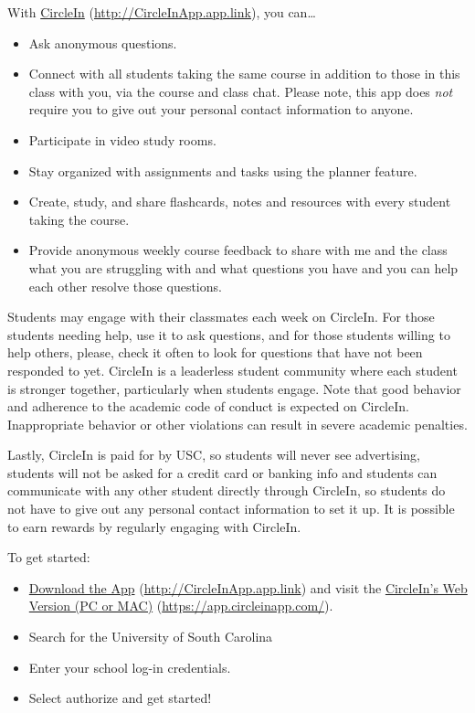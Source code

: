 \documentclass[11pt,letterpaper]{article}
\begin{document}
With \href{http://CircleInApp.app.link}{CircleIn} (\url{http://CircleInApp.app.link}), you can\dots
	\begin{itemize}
	\item Ask anonymous questions.
	\item Connect with all students taking the same course in addition to those in this class with you, via the course and class chat. Please note, this app does {\itshape not} require you to give out your personal contact information to anyone.
	\item Participate in video study rooms.
	\item Stay organized with assignments and tasks using the planner feature.
	\item Create, study, and share flashcards, notes and resources with every student taking the course.
	\item Provide anonymous weekly course feedback to share with me and the class what you are struggling with and what questions you have and you can help each other resolve those questions. 
	\end{itemize}

Students may engage with their classmates each week on CircleIn. For those students needing help, use it to ask questions, and for those students willing to help others, please, check it often to look for questions that have not been responded to yet. CircleIn is a leaderless student community where each student is stronger together, particularly when students engage. Note that good behavior and adherence to the academic code of conduct is expected on CircleIn. Inappropriate behavior or other violations can result in severe academic penalties. \par\vspace{0.3cm}

Lastly, CircleIn is paid for by USC, so students will never see advertising, students will not be asked for a credit card or banking info and students can communicate with any other student directly through CircleIn, so students do not have to give out any personal contact information to set it up. It is possible to earn rewards by regularly engaging with CircleIn. \par\vspace{0.3cm}





\newpage





To get started:
	\begin{itemize}
	\item \href{http://CircleInApp.app.link}{Download the App} (\url{http://CircleInApp.app.link}) and visit the \href{https://app.circleinapp.com/}{CircleIn's Web Version (PC or MAC)} (\url{https://app.circleinapp.com/}).
	\item Search for the University of South Carolina
	\item Enter your school log-in credentials. 
	\item Select authorize and get started! 
	\end{itemize}
\sectionbreak
\end{document}
